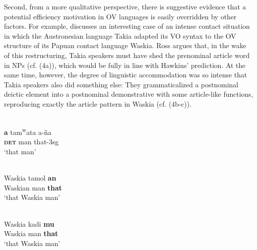 \documentclass[output=paper]{langsci/langscibook}
\begin{document}
Second, from a more qualitative perspective, there is suggestive evidence that a potential efficiency motivation in OV languages is easily overridden by other factors. For example, \citet{Ross2001} discusses an interesting case of an intense contact situation in which the Austronesian language Takia adapted its VO syntax to the OV structure of its Papuan contact language Waskia. Ross argues that, in the wake of this restructuring, Takia speakers must have shed the prenominal article word in NPs (cf. (4a)), which would be fully in line with Hawkins’ prediction. At the same time, however, the degree of linguistic accommodation was so intense that Takia speakers also did something else: They grammaticalized a postnominal deictic element into a postnominal demonstrative with some article-like functions, reproducing exactly the article pattern in Waskia (cf. (4b-c)).

\ea\label{ex:ksb:} 
\ea
{}\\
\gll \textbf{a}   tam\textsuperscript{w}ata   a-ña\\
     \textbf{\textsc{det}}   man   that-3sg\\
\glt ‘that man’

\ex\label{ex:ksb:}
\\
\gll Waskia   tamol  \textbf{an}\\
     Waskian   man   \textbf{that}\\
\glt ‘that Waskia man’

\ex\label{ex:ksb:}
\\
\gll Waskia   kadi   \textbf{mu}\\
     Waskia   man   \textbf{that}\\
\glt ‘that Waskia man’
\z
\z
\end{document}
